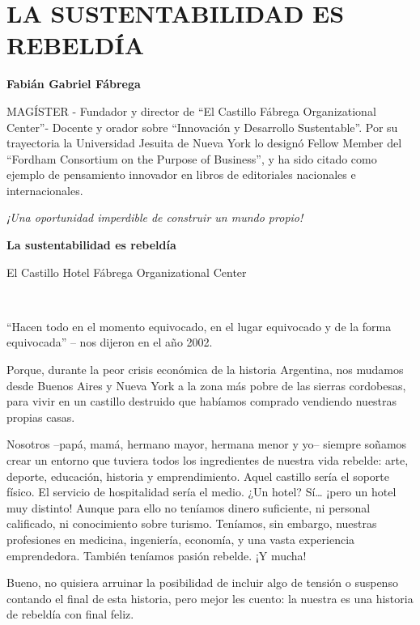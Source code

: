 \chapter{LA SUSTENTABILIDAD ES
REBELDÍA}\label{la-sustentabilidad-es-rebelduxeda}


\textbf{Fabián Gabriel Fábrega}

MAGÍSTER - Fundador y director de ``El Castillo Fábrega Organizational
Center''- Docente y orador sobre ``Innovación y Desarrollo
Sustentable''. Por su trayectoria la Universidad Jesuita de Nueva York
lo designó Fellow Member del ``Fordham Consortium on the Purpose of
Business'', y ha sido citado como ejemplo de pensamiento innovador en
libros de editoriales nacionales e internacionales.

\emph{¡Una oportunidad imperdible de construir un mundo propio!}

\textbf{La sustentabilidad es rebeldía}

El Castillo Hotel Fábrega Organizational Center

~

``Hacen todo en el momento equivocado, en el lugar equivocado y de la
forma equivocada'' -- nos dijeron en el año 2002.

Porque, durante la peor crisis económica de la historia Argentina, nos
mudamos desde Buenos Aires y Nueva York a la zona más pobre de las
sierras cordobesas, para vivir en un castillo destruido que habíamos
comprado vendiendo nuestras propias casas.

Nosotros --papá, mamá, hermano mayor, hermana menor y yo-- siempre
soñamos crear un entorno que tuviera todos los ingredientes de nuestra
vida rebelde: arte, deporte, educación, historia y emprendimiento. Aquel
castillo sería el soporte físico. El servicio de hospitalidad sería el
medio. ¿Un hotel? Sí\ldots{} ¡pero un hotel muy distinto! Aunque para
ello no teníamos dinero suficiente, ni personal calificado, ni
conocimiento sobre turismo. Teníamos, sin embargo, nuestras profesiones
en medicina, ingeniería, economía, y una vasta experiencia emprendedora.
También teníamos pasión rebelde. ¡Y mucha!

Bueno, no quisiera arruinar la posibilidad de incluir algo de tensión o
suspenso contando el final de esta historia, pero mejor les cuento: la
nuestra es una historia de rebeldía con final feliz.

